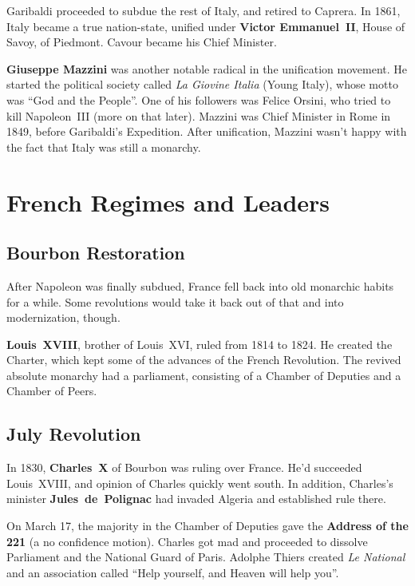 Garibaldi proceeded to subdue the rest of Italy, and retired to Caprera.
In 1861, Italy became a true nation-state,
unified under \textbf{Victor Emmanuel~II}, House of Savoy, of Piedmont.
Cavour became his Chief Minister.

\textbf{Giuseppe Mazzini} was another notable radical in the unification movement.
He started the political society called \textit{La Giovine Italia} (Young Italy),
whose motto was ``God and the People''.
One of his followers was Felice Orsini, who tried to kill Napoleon~III (more on that later).
Mazzini was Chief Minister in Rome in 1849, before Garibaldi's Expedition.
After unification, Mazzini wasn't happy with the fact that Italy was still a monarchy.

\section{French Regimes and Leaders}

\subsection*{Bourbon Restoration}

After Napoleon was finally subdued, France fell back into old monarchic habits for a while.
Some revolutions would take it back out of that and into modernization, though.

\textbf{Louis~XVIII}, brother of Louis~XVI, ruled from 1814 to 1824.
He created the Charter, which kept some of the advances of the French Revolution.
The revived absolute monarchy had a parliament,
consisting of a Chamber of Deputies and a Chamber of Peers.

\subsection*{July Revolution}

In 1830, \textbf{Charles~X} of Bourbon was ruling over France.
He'd succeeded Louis~XVIII, and opinion of Charles quickly went south.
In addition,
Charles's minister \textbf{Jules~de~Polignac} had invaded Algeria and established rule there.

On March 17,
the majority in the Chamber of Deputies gave the \textbf{Address of the 221}
(a no confidence motion).
Charles got mad and proceeded to dissolve Parliament and the National Guard of Paris.
Adolphe Thiers created \textit{Le National} and an association called
``Help yourself, and Heaven will help you''.

